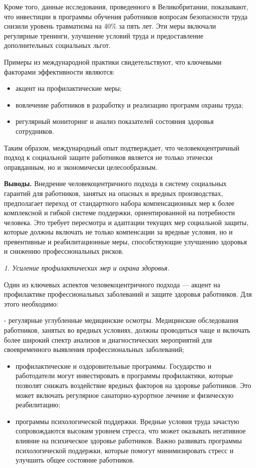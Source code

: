 Кроме того, данные исследования, проведенного в Великобритании,
показывают, что инвестиции в программы обучения работников вопросам
безопасности труда снизили уровень травматизма на 40\% за пять лет. Эти
меры включали регулярные тренинги, улучшение условий труда и
предоставление дополнительных социальных льгот\hspace{0pt}.

Примеры из международной практики свидетельствуют, что ключевыми
факторами эффективности являются:

\begin{itemize}
\item
  акцент на профилактические меры;
\item
  вовлечение работников в разработку и реализацию программ охраны труда;
\item
  регулярный мониторинг и анализ показателей состояния здоровья
  сотрудников.
\end{itemize}

Таким образом, международный опыт подтверждает, что человекоцентричный
подход к социальной защите работников является не только этически
оправданным, но и экономически целесообразным.

{\bfseries Выводы.} Внедрение человекоцентричного подхода в систему
социальных гарантий для работников, занятых на опасных и вредных
производствах, предполагает переход от стандартного набора
компенсационных мер к более комплексной и гибкой системе поддержки,
ориентированной на потребности человека. Это требует пересмотра и
адаптации текущих мер социальной защиты, которые должны включать не
только компенсации за вредные условия, но и превентивные и
реабилитационные меры, способствующие улучшению здоровья и снижению
профессиональных рисков.

\emph{1. Усиление профилактических мер и охрана здоровья.}

Один из ключевых аспектов человекоцентричного подхода --- акцент на
профилактике профессиональных заболеваний и защите здоровья работников.
Для этого необходимо:

- регулярные углубленные медицинские осмотры. Медицинские обследования
работников, занятых во вредных условиях, должны проводиться чаще и
включать более широкий спектр анализов и диагностических мероприятий для
своевременного выявления профессиональных заболеваний;

\begin{itemize}
\item
  профилактические и оздоровительные программы. Государство и
  работодатели могут инвестировать в программы профилактики, которые
  позволят снижать воздействие вредных факторов на здоровье работников.
  Это может включать регулярное санаторно-курортное лечение и физическую
  реабилитацию;
\item
  программы психологической поддержки. Вредные условия труда зачастую
  сопровождаются высоким уровнем стресса, что может оказывать негативное
  влияние на психическое здоровье работников. Важно развивать программы
  психологической поддержки, которые помогут минимизировать стресс и
  улучшить общее состояние работников.
\end{itemize}

